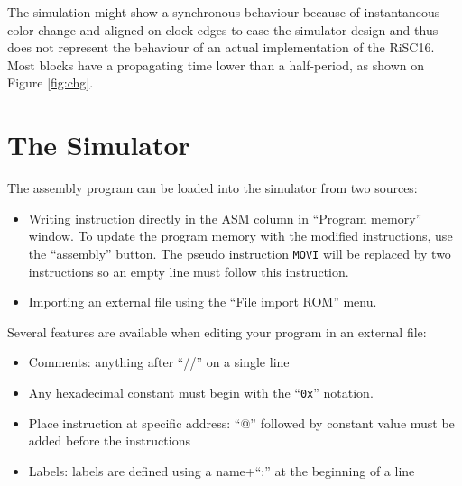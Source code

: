 \documentclass[10pt,a4paper]{article}
\theoremstyle{definition}%
\begin{document}


The simulation might show a synchronous behaviour because of instantaneous color change and aligned on clock edges to ease the simulator design and thus does not represent the behaviour of an actual implementation of the RiSC16. Most blocks have a propagating time lower than a half-period, as shown on Figure \vref{fig:chg}.

\section{The Simulator}

The assembly program can be loaded into the simulator from two sources:
\begin{itemize}
\item Writing instruction directly in the ASM column in ``Program memory'' window. To update the program memory with the modified instructions, use the ``assembly'' button. The pseudo instruction \verb!MOVI! will be replaced by two instructions so an empty line must follow this instruction.
\item Importing an external file using the ``File import ROM'' menu.
\end{itemize}

Several features are available when editing your program in an external file:
\begin{itemize}
\item Comments: anything after ``//'' on a single line
\item Any hexadecimal constant must begin with the ``\verb!0x!'' notation.
\item Place instruction at specific address: ``@'' followed by constant value must be added before the instructions
\item Labels: labels are defined using a name+``:'' at the beginning of a line
\end{itemize}
\end{document}
